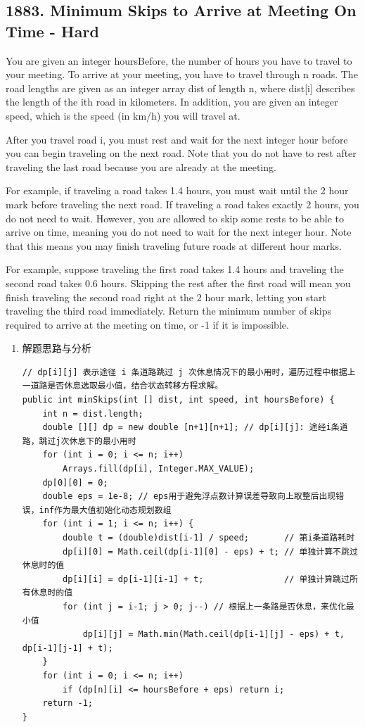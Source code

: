 \documentclass[9pt, b5paaper]{book}
\begin{document}
\subsection{1883. Minimum Skips to Arrive at Meeting On Time - Hard}
\label{sec-1-4-7}
You are given an integer hoursBefore, the number of hours you have to travel to your meeting. To arrive at your meeting, you have to travel through n roads. The road lengths are given as an integer array dist of length n, where dist[i] describes the length of the ith road in kilometers. In addition, you are given an integer speed, which is the speed (in km/h) you will travel at.

After you travel road i, you must rest and wait for the next integer hour before you can begin traveling on the next road. Note that you do not have to rest after traveling the last road because you are already at the meeting.

For example, if traveling a road takes 1.4 hours, you must wait until the 2 hour mark before traveling the next road. If traveling a road takes exactly 2 hours, you do not need to wait.
However, you are allowed to skip some rests to be able to arrive on time, meaning you do not need to wait for the next integer hour. Note that this means you may finish traveling future roads at different hour marks.

For example, suppose traveling the first road takes 1.4 hours and traveling the second road takes 0.6 hours. Skipping the rest after the first road will mean you finish traveling the second road right at the 2 hour mark, letting you start traveling the third road immediately.
Return the minimum number of skips required to arrive at the meeting on time, or -1 if it is impossible.
\begin{enumerate}
\item 解题思路与分析
\label{sec-1-4-7-1}
\begin{verbatim}
// dp[i][j] 表示途径 i 条道路跳过 j 次休息情况下的最小用时，遍历过程中根据上一道路是否休息选取最小值，结合状态转移方程求解。
public int minSkips(int [] dist, int speed, int hoursBefore) {
    int n = dist.length;
    double [][] dp = new double [n+1][n+1]; // dp[i][j]: 途经i条道路，跳过j次休息下的最小用时
    for (int i = 0; i <= n; i++) 
        Arrays.fill(dp[i], Integer.MAX_VALUE);
    dp[0][0] = 0;
    double eps = 1e-8; // eps用于避免浮点数计算误差导致向上取整后出现错误，inf作为最大值初始化动态规划数组
    for (int i = 1; i <= n; i++) {
        double t = (double)dist[i-1] / speed;       // 第i条道路耗时
        dp[i][0] = Math.ceil(dp[i-1][0] - eps) + t; // 单独计算不跳过休息时的值
        dp[i][i] = dp[i-1][i-1] + t;                // 单独计算跳过所有休息时的值
        for (int j = i-1; j > 0; j--) // 根据上一条路是否休息，来优化最小值
            dp[i][j] = Math.min(Math.ceil(dp[i-1][j] - eps) + t, dp[i-1][j-1] + t);
    }
    for (int i = 0; i <= n; i++) 
        if (dp[n][i] <= hoursBefore + eps) return i;
    return -1;
}
\end{verbatim}
\end{enumerate}
\end{document}
